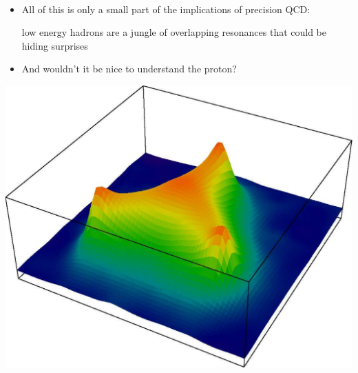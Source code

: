 \documentclass[landscape]{article}
\newenvironment{slide}[1][ ]{\mbox{\bf \boldmath #1 } \vfill}{\vfill \vspace{-1.5 cm} \mbox{ } \pagebreak}
\newenvironment{itemizer}[1]{\begin{itemize}\setlength{\itemsep}{#1}}{\end{itemize}}
\begin{document}
\begin{slide}

\begin{itemizer}{1 cm}

  \item All of this is only a small part of the implications of
  precision QCD:

  low energy hadrons are a jungle of overlapping resonances that could be hiding surprises

  \item And wouldn't it be nice to understand the proton?

\end{itemizer}

\vfill

\begin{center}
  \includegraphics[width=0.6\linewidth]{../qcd_proton}
\end{center}

\end{slide}
\end{document}
